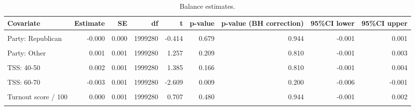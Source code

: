 \begin{table}
\centering
\caption{Balance estimates.}
\centering
\fontsize{8}{10}\selectfont
\begin{tabular}[t]{lrrrrrrrr}
\toprule
Covariate & Estimate & SE & df & t & p-value & p-value (BH correction) & 95\%CI lower & 95\%CI upper\\
\midrule
\cellcolor{gray!10}{Party: Democrat} & \cellcolor{gray!10}{-0.001} & \cellcolor{gray!10}{0.001} & \cellcolor{gray!10}{1999280} & \cellcolor{gray!10}{-1.211} & \cellcolor{gray!10}{0.226} & \cellcolor{gray!10}{0.810} & \cellcolor{gray!10}{-0.003} & \cellcolor{gray!10}{0.001}\\
Party: Republican & -0.000 & 0.000 & 1999280 & -0.414 & 0.679 & 0.944 & -0.001 & 0.001\\
\cellcolor{gray!10}{Party: Unknown} & \cellcolor{gray!10}{0.000} & \cellcolor{gray!10}{0.001} & \cellcolor{gray!10}{1999280} & \cellcolor{gray!10}{0.091} & \cellcolor{gray!10}{0.927} & \cellcolor{gray!10}{0.944} & \cellcolor{gray!10}{-0.002} & \cellcolor{gray!10}{0.003}\\
Party: Other & 0.001 & 0.001 & 1999280 & 1.257 & 0.209 & 0.810 & -0.001 & 0.003\\
\cellcolor{gray!10}{TSS: 30-40} & \cellcolor{gray!10}{0.001} & \cellcolor{gray!10}{0.001} & \cellcolor{gray!10}{1999280} & \cellcolor{gray!10}{1.219} & \cellcolor{gray!10}{0.223} & \cellcolor{gray!10}{0.810} & \cellcolor{gray!10}{-0.001} & \cellcolor{gray!10}{0.004}\\
TSS: 40-50 & 0.002 & 0.001 & 1999280 & 1.385 & 0.166 & 0.810 & -0.001 & 0.004\\
\cellcolor{gray!10}{TSS: 50-60} & \cellcolor{gray!10}{0.000} & \cellcolor{gray!10}{0.001} & \cellcolor{gray!10}{1999280} & \cellcolor{gray!10}{0.229} & \cellcolor{gray!10}{0.819} & \cellcolor{gray!10}{0.944} & \cellcolor{gray!10}{-0.002} & \cellcolor{gray!10}{0.003}\\
TSS: 60-70 & -0.003 & 0.001 & 1999280 & -2.609 & 0.009 & 0.200 & -0.006 & -0.001\\
\cellcolor{gray!10}{Trump support score / 100} & \cellcolor{gray!10}{-0.001} & \cellcolor{gray!10}{0.000} & \cellcolor{gray!10}{1999280} & \cellcolor{gray!10}{-2.260} & \cellcolor{gray!10}{0.024} & \cellcolor{gray!10}{0.262} & \cellcolor{gray!10}{-0.001} & \cellcolor{gray!10}{-0.000}\\
Turnout score / 100 & 0.000 & 0.001 & 1999280 & 0.707 & 0.480 & 0.944 & -0.001 & 0.002\\
\cellcolor{gray!10}{Ideology score / 100} & \cellcolor{gray!10}{0.000} & \cellcolor{gray!10}{0.000} & \cellcolor{gray!10}{1999280} & \cellcolor{gray!10}{0.070} & \cellcolor{gray!10}{0.944} & \cellcolor{gray!10}{0.944} & \cellcolor{gray!10}{-0.001} & \cellcolor{gray!10}{0.001}\\

\end{tabular}
\end{table}
